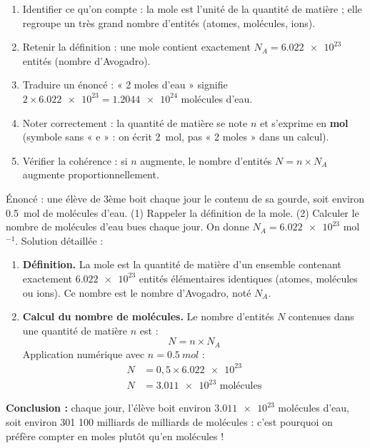 \documentclass[11pt]{article}
\newcommand{\cle}[1]{{\popxbold\color{popdark}#1}}
\begin{document}
\begin{methode}
\begin{enumerate}
\item \cle{Identifier} ce qu'on compte : la mole est l'unité de la \cle{quantité de matière} ; elle regroupe un très grand nombre d'entités (atomes, molécules, ions).
\item \cle{Retenir} la définition : une mole contient exactement $N_A = \num{6,022e23}$ entités (nombre d'Avogadro).
\item \cle{Traduire} un énoncé : « 2 moles d'eau » signifie $2 \times \num{6,022e23} = \num{1,2044e24}$ molécules d'eau.
\item \cle{Noter correctement} : la quantité de matière se note $n$ et s'exprime en \textbf{mol} (symbole sans « e » : on écrit \SI{2}{mol}, pas « 2 moles » dans un calcul).
\item \cle{Vérifier} la cohérence : si $n$ augmente, le nombre d'entités $N = n \times N_A$ augmente proportionnellement.
\end{enumerate}
\end{methode}

\begin{exoresolu}
Énoncé : une élève de 3ème boit chaque jour le contenu de sa gourde, soit environ \SI{0,5}{mol} de molécules d'eau. (1) Rappeler la définition de la mole. (2) Calculer le nombre de molécules d'eau bues chaque jour. On donne $N_A = \num{6,022e23}$ mol$^{-1}$.
\tcblower
Solution détaillée :
\begin{enumerate}
\item \textbf{Définition.} La \cle{mole} est la quantité de matière d'un ensemble contenant exactement $\num{6,022e23}$ entités élémentaires identiques (atomes, molécules ou ions). Ce nombre est le \cle{nombre d'Avogadro}, noté $N_A$.
\item \textbf{Calcul du nombre de molécules.} Le nombre d'entités $N$ contenues dans une quantité de matière $n$ est :
\[ N = n \times N_A \]
Application numérique avec $n = \SI{0,5}{mol}$ :
\begin{align*}
N &= 0,5 \times \num{6,022e23} \\
N &= \num{3,011e23} \text{ molécules}
\end{align*}
\end{enumerate}
\textbf{Conclusion :} chaque jour, l'élève boit environ $\num{3,011e23}$ molécules d'eau, soit environ 301 100 milliards de milliards de molécules : c'est pourquoi on préfère compter en moles plutôt qu'en molécules !
\end{exoresolu}
\end{document}
